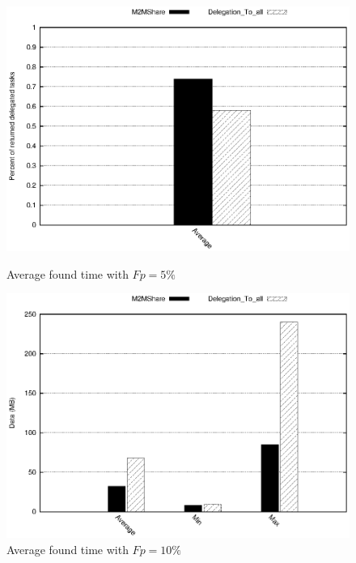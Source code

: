\begin{figure}[ht]
\begin{minipage}[b]{0.5\linewidth}
\centering
\includegraphics[scale=0.5]{grafici/percDeleghe.eps}
\caption{Average found time with $Fp = 5\%$}
\label{graficiTempiVF_Fp5}
\end{minipage}
\hspace{0.5cm}
\begin{minipage}[b]{0.5\linewidth}
\centering
\includegraphics[scale=0.5]{grafici/data.eps}
\caption{Average found time with $Fp = 10\%$}
\label{graficiTempiVF_Fp10}
\end{minipage}
\hspace{0.5cm}
\begin{center}
\begin{minipage}[b]{0.5\linewidth}

\end{minipage}
\end{center}
\end{figure}

